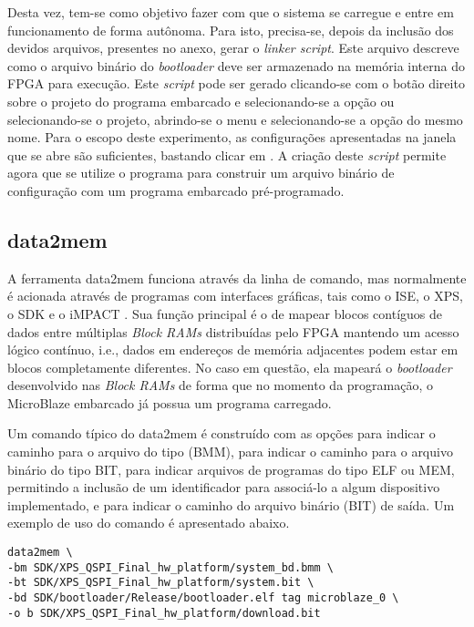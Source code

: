 \documentclass[11pt,a4paper,oneside]{book}
\begin{document}
Desta vez, tem-se como objetivo fazer com que o sistema se carregue e entre em funcionamento de forma autônoma.
Para isto, precisa-se, depois da inclusão dos devidos arquivos, presentes no anexo, gerar o \textit{linker script}.
Este arquivo descreve como o arquivo binário do \textit{bootloader} deve ser armazenado na memória interna do FPGA para execução.
Este \textit{script} pode ser gerado clicando-se com o botão direito sobre o projeto do programa embarcado e selecionando-se a opção  ou selecionando-se o projeto, abrindo-se o menu  e selecionando-se a opção do mesmo nome.
Para o escopo deste experimento, as configurações apresentadas na janela que se abre são suficientes, bastando clicar em .
A criação deste \textit{script} permite agora que se utilize o programa  para construir um arquivo binário de configuração com um programa embarcado pré-programado.

\subsection{data2mem}
A ferramenta data2mem funciona através da linha de comando, mas normalmente é acionada através de programas com interfaces gráficas, tais como o ISE, o XPS, o SDK e o iMPACT \cite{ug658}.
Sua função principal é o de mapear blocos contíguos de dados entre múltiplas \textit{Block RAMs} distribuídas pelo FPGA mantendo um acesso lógico contínuo, i.e., dados em endereços de memória adjacentes podem estar em blocos completamente diferentes.
No caso em questão, ela mapeará o \textit{bootloader} desenvolvido nas \textit{Block RAMs} de forma que no momento da programação, o MicroBlaze embarcado já possua um programa carregado.

Um comando típico do data2mem é construído com as opções  para indicar o caminho para o arquivo do tipo  (BMM),  para indicar o caminho para o arquivo binário do tipo BIT,  para indicar arquivos de programas do tipo ELF ou MEM, permitindo a inclusão de um identificador para associá-lo a algum dispositivo implementado, e  para indicar o caminho do arquivo binário (BIT) de saída.
Um exemplo de uso do comando é apresentado abaixo.
\begin{lstlisting}[style=customVHDL]
data2mem \
-bm SDK/XPS_QSPI_Final_hw_platform/system_bd.bmm \
-bt SDK/XPS_QSPI_Final_hw_platform/system.bit \
-bd SDK/bootloader/Release/bootloader.elf tag microblaze_0 \
-o b SDK/XPS_QSPI_Final_hw_platform/download.bit
\end{lstlisting}
\end{document}
